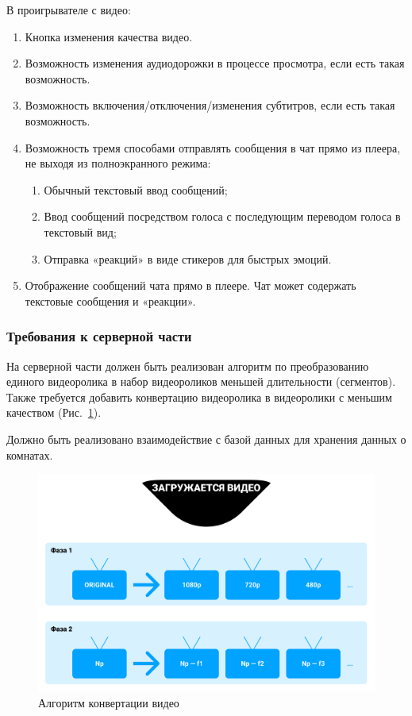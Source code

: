 В проигрывателе с видео:
\begin{enumerate}[noitemsep]
    \item Кнопка изменения качества видео.
    \item Возможность изменения аудиодорожки в процессе просмотра, если есть такая возможность.
    \item Возможность включения/отключения/изменения субтитров, если есть такая возможность.
    \item Возможность тремя способами отправлять сообщения в чат прямо из плеера, не выходя из полноэкранного режима:
    \begin{enumerate}
        \item Обычный текстовый ввод сообщений;
        \item Ввод сообщений посредством голоса с последующим переводом голоса в текстовый вид;
        \item Отправка «реакций» в виде стикеров для быстрых эмоций.
    \end{enumerate}
    \item Отображение сообщений чата прямо в плеере.
    Чат может содержать текстовые сообщения и «реакции».
\end{enumerate}

\newpage

\subsubsection{Требования к серверной части}
На серверной части должен быть реализован алгоритм по преобразованию единого видеоролика в набор видеороликов меньшей длительности
(сегментов).
Также требуется добавить конвертацию видеоролика в видеоролики с меньшим качеством (Рис.~\ref{ris:server_converting}).

Должно быть реализовано взаимодействие с базой данных для хранения данных о комнатах.

\begin{figure}[h]
    \centering
    \includegraphics[width=1\linewidth]{images/server_converting.png}
    \caption{Алгоритм конвертации видео}
    \label{ris:server_converting}
\end{figure}

